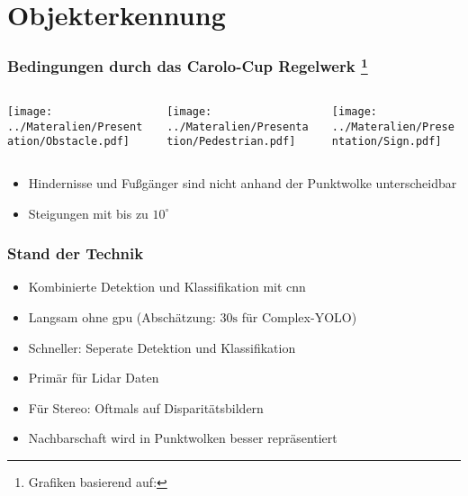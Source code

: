 \section{Objekterkennung}
\begin{frame}
    \frametitle{Bedingungen durch das Carolo-Cup Regelwerk
    \footnote{Grafiken basierend auf: }}
    \begin{columns}
        \begin{column}{.33\textwidth}
            \texttt{[image: ../Materalien/Presentation/Obstacle.pdf]}
        \end{column}
        \pause
        \begin{column}{.33\textwidth}
            \texttt{[image: ../Materalien/Presentation/Pedestrian.pdf]}
        \end{column}
        \pause
        \begin{column}{.33\textwidth}
            \texttt{[image: ../Materalien/Presentation/Sign.pdf]}
        \end{column}
    \end{columns}
    \pause
    \begin{itemize}
        \item Hindernisse und Fußgänger sind nicht anhand der Punktwolke unterscheidbar
            \pause
        \item Steigungen mit bis zu $10^\circ$
    \end{itemize}
\end{frame}

\begin{frame}
    \frametitle{Stand der Technik}
    \begin{itemize}
        \item Kombinierte Detektion und Klassifikation mit \acf{cnn}
            \pause
        \item Langsam ohne \ac{gpu} (Abschätzung: $30\si{\s}$ für Complex-YOLO)
            \pause
        \item Schneller: Seperate Detektion und Klassifikation
            \pause
        \item Primär für Lidar Daten
            \pause
        \item Für Stereo: Oftmals auf Disparitätsbildern
            \pause
        \item Nachbarschaft wird in Punktwolken besser repräsentiert 
    \end{itemize}
\end{frame}

